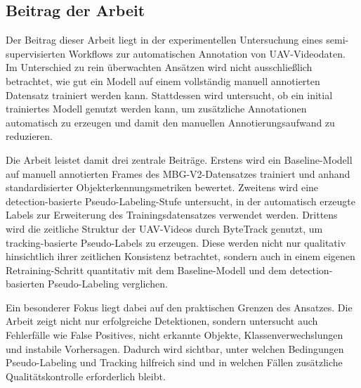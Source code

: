 \subsection{Beitrag der Arbeit}

Der Beitrag dieser Arbeit liegt in der experimentellen Untersuchung eines
semi-supervisierten Workflows zur automatischen Annotation von UAV-Videodaten.
Im Unterschied zu rein überwachten Ansätzen wird nicht ausschließlich betrachtet,
wie gut ein Modell auf einem vollständig manuell annotierten Datensatz trainiert
werden kann. Stattdessen wird untersucht, ob ein initial trainiertes Modell genutzt
werden kann, um zusätzliche Annotationen automatisch zu erzeugen und damit den
manuellen Annotierungsaufwand zu reduzieren.

Die Arbeit leistet damit drei zentrale Beiträge. Erstens wird ein Baseline-Modell
auf manuell annotierten Frames des MBG-V2-Datensatzes trainiert und anhand
standardisierter Objekterkennungsmetriken bewertet. Zweitens wird eine
detection-basierte Pseudo-Labeling-Stufe untersucht, in der automatisch erzeugte
Labels zur Erweiterung des Trainingsdatensatzes verwendet werden. Drittens wird
die zeitliche Struktur der UAV-Videos durch ByteTrack genutzt, um
tracking-basierte Pseudo-Labels zu erzeugen. Diese werden nicht nur qualitativ
hinsichtlich ihrer zeitlichen Konsistenz betrachtet, sondern auch in einem eigenen
Retraining-Schritt quantitativ mit dem Baseline-Modell und dem
detection-basierten Pseudo-Labeling verglichen.

Ein besonderer Fokus liegt dabei auf den praktischen Grenzen des Ansatzes. Die
Arbeit zeigt nicht nur erfolgreiche Detektionen, sondern untersucht auch
Fehlerfälle wie False Positives, nicht erkannte Objekte, Klassenverwechslungen
und instabile Vorhersagen. Dadurch wird sichtbar, unter welchen Bedingungen
Pseudo-Labeling und Tracking hilfreich sind und in welchen Fällen zusätzliche
Qualitätskontrolle erforderlich bleibt.
